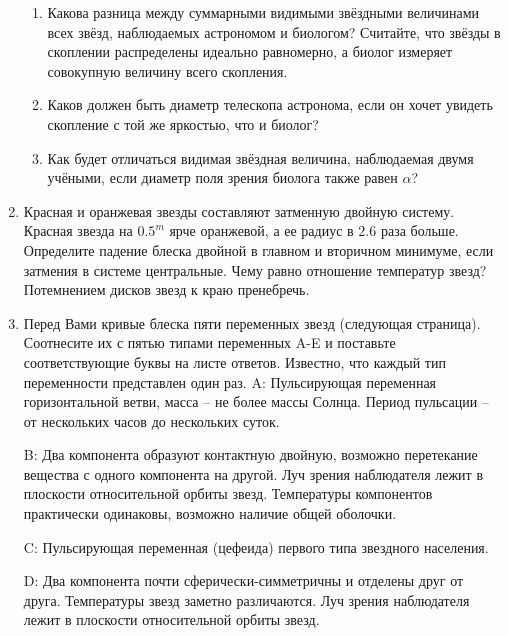 \documentclass[12pt]{article}
\begin{document}
\begin{enumerate}
    \begin{enumerate}
        \item Какова разница между суммарными видимыми звёздными величинами всех звёзд, наблюдаемых астрономом и биологом? Считайте, что звёзды в скоплении распределены идеально равномерно, а биолог измеряет совокупную величину всего скопления.
        \item Каков должен быть диаметр телескопа астронома, если он хочет увидеть скопление с той же яркостью, что и биолог?
        \item Как будет отличаться видимая звёздная величина, наблюдаемая двумя учёными, если диаметр поля зрения биолога также равен $\alpha$?
    \end{enumerate}
    \item Красная и оранжевая звезды составляют затменную двойную систему. Красная звезда на $0.5^m$ ярче оранжевой, а ее радиус в $2.6$ раза больше. Определите падение блеска двойной в главном и вторичном минимуме, если затмения в системе центральные. Чему равно отношение температур звезд? Потемнением дисков звезд к краю пренебречь.
    \item Перед Вами кривые блеска пяти переменных звезд (следующая страница). Соотнесите их с пятью типами переменных A-E и поставьте соответствующие буквы на листе ответов. Известно, что каждый тип переменности представлен один раз.
    A: Пульсирующая переменная горизонтальной ветви, масса -- не более массы Солнца. Период пульсации -- от нескольких часов до нескольких суток.

    B: Два компонента образуют контактную двойную, возможно перетекание вещества с одного компонента на другой. Луч зрения наблюдателя лежит в плоскости относительной орбиты звезд. Температуры компонентов практически одинаковы, возможно наличие общей оболочки.

    C: Пульсирующая переменная (цефеида) первого типа звездного населения.

    D: Два компонента почти сферически-симметричны и отделены друг от друга. Температуры звезд заметно различаются. Луч зрения наблюдателя лежит в плоскости относительной орбиты звезд.


\end{enumerate}
\end{document}
